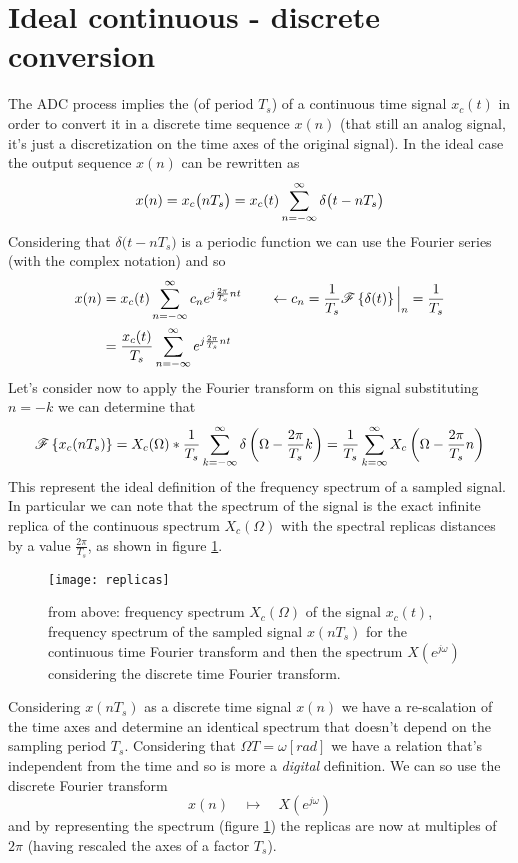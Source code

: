 \section{Ideal continuous - discrete conversion}
	The  ADC process implies the  (of period $T_s$) of a continuous time signal $x_c(t)$ in order to convert it in a discrete time sequence $x(n)$ (that still an analog signal, it's just a discretization on the time axes of the original signal). In the ideal case the output sequence $x(n)$ can be rewritten as
	\begin{equation}
		x(n) =x_c\big(nT_s\big) = x_c(t) \sum_{n=-\infty}^\infty \delta\big(t-nT_s\big)  
	\end{equation}
	Considering that $\delta\big(t-nT_s\big)$ is a periodic function we can use the Fourier series (with the complex notation) and so
	\begin{align*}
		x(n) & = x_c(t) \sum_{n=-\infty}^\infty c_n e^{j\frac{2\pi}{T_s}nt} \qquad \leftarrow c_n = \frac 1 {T_s} \mathscr{F}\left\{ \delta(t) \right\}\Big|_{n} = \frac 1 {T_s} \\
		&= \frac{x_c(t)}{T_s} \sum_{n=-\infty}^\infty e^{j\frac{2\pi}{T_s}nt}
	\end{align*}
	Let's consider now to apply the Fourier transform on this signal substituting $n = -k$ we can determine that
	\begin{equation}
		\mathscr{F}\left\{ x_c(nT_s) \right\} = X_c(\Omega) * \frac 1 {T_s}\sum_{k=-\infty}^\infty \delta\left(\Omega- \frac{2\pi}{T_s}k\right) = \frac{1}{T_s} \sum_{k=\infty}^\infty X_c\left(\Omega - \frac{2\pi}{T_s}n \right)
	\end{equation}
	This represent the ideal definition of the frequency spectrum of a sampled signal. In particular we can note that the spectrum of the signal is the exact infinite replica of the continuous spectrum $X_c(\Omega)$ with the spectral replicas distances by a value $\frac{2\pi}{T_s}$, as shown in figure  \ref{fig:conv:replicas}.
	
	\begin{figure}[bht]
		\centering
		\texttt{[image: replicas]}
		\caption{from above: frequency spectrum $X_c(\Omega)$ of the signal $x_c(t)$, frequency spectrum of the sampled signal $x(nT_s)$ for the continuous time Fourier transform and then the spectrum $X(e^{j\omega})$ considering the discrete time Fourier transform.} 
		\label{fig:conv:replicas}
	\end{figure}
		
	Considering $x(nT_s)$ as a discrete time signal $x(n)$ we have a re-scalation of the time axes and determine an identical spectrum that doesn't depend on the sampling period $T_s$. Considering that $\Omega T = \omega [rad]$ we have a relation that's independent from the time and so is more a \textit{digital} definition. We can so use the discrete Fourier transform
	\[ x(n) \quad \mapsto \quad X(e^{j\omega})\]
	and by representing the spectrum (figure \ref{fig:conv:replicas}) the replicas are now at multiples of $2\pi$ (having rescaled the axes of a factor $T_s$).
	
